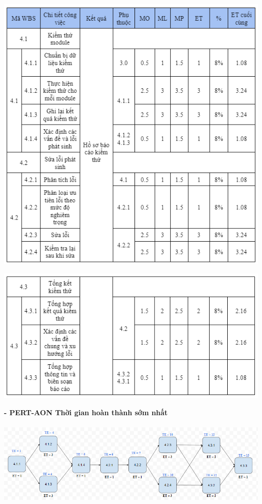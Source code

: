 \documentclass[12pt]{article}
\begin{document}
\includegraphics[width=14.5cm]{ThoiGian4_1.png}
\par
\includegraphics[width=14.5cm]{ThoiGian4_2.png}
\vspace{0.5cm}

\hspace{1cm}\textbf{- PERT-AON Thời gian hoàn thành sớm nhất \\\\} 
\vspace*{0.5cm}    
\hspace{0.7cm}\includegraphics[width=14.5cm]{PERT4_1.png}
\vspace{0.5cm}  
\end{document}
